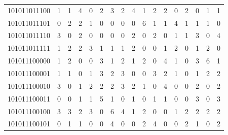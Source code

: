 \documentclass[10pt,a4paper]{article}
\begin{document}
\begin{longtable}{ |c|c|c|c|c|c|c|c|c|c|c|c|c|c|c|c|c| }
    101011011100              & 1                            & 1                                & 4                            & 0                              & 2   & 3   & 2   & 4   & 1   & 2   & 2   & 0   & 2   & 0   & 1   & 1   \\
    101011011101              & 0                            & 2                                & 2                            & 1                              & 0   & 0   & 0   & 0   & 6   & 1   & 1   & 4   & 1   & 1   & 1   & 0   \\
    101011011110              & 3                            & 0                                & 2                            & 0                              & 0   & 0   & 0   & 2   & 0   & 2   & 0   & 1   & 1   & 3   & 0   & 4   \\
    101011011111              & 1                            & 2                                & 2                            & 3                              & 1   & 1   & 1   & 2   & 0   & 0   & 1   & 2   & 0   & 1   & 2   & 0   \\
    101011100000              & 1                            & 2                                & 0                            & 0                              & 3   & 1   & 2   & 1   & 2   & 0   & 4   & 1   & 0   & 3   & 6   & 1   \\
    101011100001              & 1                            & 1                                & 0                            & 1                              & 3   & 2   & 3   & 0   & 0   & 3   & 2   & 1   & 0   & 1   & 2   & 2   \\
    101011100010              & 3                            & 0                                & 1                            & 2                              & 2   & 2   & 3   & 2   & 1   & 0   & 4   & 0   & 0   & 2   & 0   & 2   \\
    101011100011              & 0                            & 0                                & 1                            & 1                              & 5   & 1   & 0   & 1   & 0   & 1   & 1   & 0   & 0   & 3   & 0   & 3   \\
    101011100100              & 3                            & 3                                & 2                            & 3                              & 0   & 6   & 4   & 1   & 2   & 0   & 0   & 1   & 2   & 2   & 2   & 2   \\
    101011100101              & 0                            & 1                                & 1                            & 0                              & 0   & 4   & 0   & 0   & 2   & 4   & 0   & 0   & 2   & 1   & 0   & 2   \\

\end{longtable}
\end{document}
